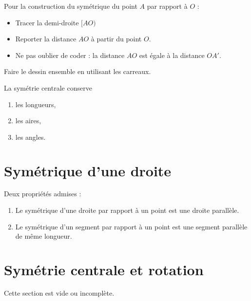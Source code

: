 Pour la construction du symétrique du point \( A\) par rapport à \( O\) :
\begin{itemize}
    \item Tracer la demi-droite \(  [AO) \)
    \item Reporter la distance \( AO\) à partir du point \( O\).
    \item Ne pas oublier de coder : la distance \( AO\) est égale à la distance \( OA'\).
\end{itemize}

\begin{center}
    
\end{center}

Faire le dessin ensemble en utilisant les carreaux.
\begin{center}
   
\end{center}

\begin{propriete}
    La symétrie centrale conserve
    \begin{enumerate}
        \item
            les longueurs,
        \item
            les aires,
        \item
            les angles.
    \end{enumerate}
\end{propriete}

\section{Symétrique d'une droite}



Deux propriétés admises :
\begin{propriete}
    \begin{enumerate}
        \item
            Le symétrique d'une droite par rapport à un point est une droite parallèle.
        \item
            Le symétrique d'un segment par rapport à un point est une segment parallèle de même longueur.
    \end{enumerate}
\end{propriete}

\section{Symétrie centrale et rotation}

Cette section est vide ou incomplète.
